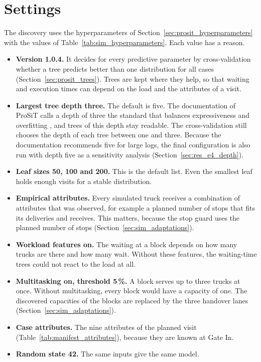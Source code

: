 \section{Settings}
\label{sec:sim_settings}

The discovery uses the hyperparameters of Section~\ref{sec:prosit_hyperparameters}
with the values of Table~\ref{tab:sim_hyperparameters}. Each value has a reason.


\begin{itemize}[itemsep=2pt,topsep=4pt]
\item \textbf{Version 1.0.4.} It decides for every predictive parameter by cross-validation
whether a tree predicts better than one distribution for all cases
(Section~\ref{sec:prosit_trees}). Trees are kept where they help, so that waiting
and execution times can depend on the load and the attributes of a visit.
\item \textbf{Largest tree depth three.} The default is five. The documentation of
ProSiT calls a depth of three the standard that balances expressiveness and
overfitting \cite{ProSiTDocs}, and trees of this depth stay readable. The
cross-validation still chooses the depth of each tree between one and three.
Because the documentation recommends five for large logs, the final configuration
is also run with depth five as a sensitivity analysis (Section~\ref{sec:res_e4_depth}).
\item \textbf{Leaf sizes 50, 100 and 200.} This is the default list. Even the
smallest leaf holds enough visits for a stable distribution.
\item \textbf{Empirical attributes.} Every simulated truck receives a combination
of attributes that was observed, for example a planned number of stops that fits
its deliveries and receives. This matters, because the stop guard uses the planned
number of stops (Section~\ref{sec:sim_adaptations}).
\item \textbf{Workload features on.} The waiting at a block depends on how many
trucks are there and how many wait. Without these features, the waiting-time
trees could not react to the load at all.
\item \textbf{Multitasking on, threshold 5\,\%.} A block serves up to three trucks
at once. Without multitasking, every block would have a capacity of one. The
discovered capacities of the blocks are replaced by the three handover lanes
(Section~\ref{sec:sim_adaptations}).
\item \textbf{Case attributes.} The nine attributes of the planned visit
(Table~\ref{tab:manifest_attributes}), because they are known at Gate In.
\item \textbf{Random state 42.} The same inputs give the same model.
\end{itemize}


